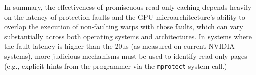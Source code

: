 In summary, the effectiveness of promiscuous read-only caching depends heavily on
the latency of protection faults and the GPU microarchitecture's ability to overlap the
execution of non-faulting warps with those faults,
which can vary substantially across both operating systems and architectures.  In
systems where the fault latency is higher than the 20us (as measured on current NVIDIA systems), more
judicious mechanisms must be used to identify read-only pages (e.g.,
explicit hints from the programmer via the \texttt{mprotect} system call.)
